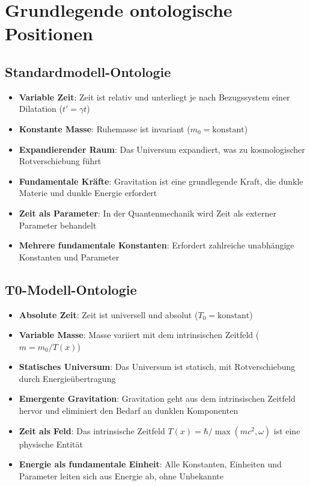 \documentclass[12pt,a4paper]{article}
\newcommand{\Tfield}{T(x)}
\newcommand{\Tzero}{T_0}
\begin{document}
	\section{Grundlegende ontologische Positionen}
	
	\subsection{Standardmodell-Ontologie}
	\begin{itemize}
		\item \textbf{Variable Zeit}: Zeit ist relativ und unterliegt je nach Bezugssystem einer Dilatation (\( t' = \gamma t \))
		\item \textbf{Konstante Masse}: Ruhemasse ist invariant (\( m_0 = \text{konstant} \))
		\item \textbf{Expandierender Raum}: Das Universum expandiert, was zu kosmologischer Rotverschiebung führt
		\item \textbf{Fundamentale Kräfte}: Gravitation ist eine grundlegende Kraft, die dunkle Materie und dunkle Energie erfordert
		\item \textbf{Zeit als Parameter}: In der Quantenmechanik wird Zeit als externer Parameter behandelt
		\item \textbf{Mehrere fundamentale Konstanten}: Erfordert zahlreiche unabhängige Konstanten und Parameter
	\end{itemize}
	
	\subsection{T0-Modell-Ontologie}
	\begin{itemize}
		\item \textbf{Absolute Zeit}: Zeit ist universell und absolut (\( \Tzero = \text{konstant} \))
		\item \textbf{Variable Masse}: Masse variiert mit dem intrinsischen Zeitfeld (\( m = m_0 / \Tfield \))
		\item \textbf{Statisches Universum}: Das Universum ist statisch, mit Rotverschiebung durch Energieübertragung
		\item \textbf{Emergente Gravitation}: Gravitation geht aus dem intrinsischen Zeitfeld hervor und eliminiert den Bedarf an dunklen Komponenten
		\item \textbf{Zeit als Feld}: Das intrinsische Zeitfeld \( \Tfield = \hbar / \max(mc^2, \omega) \) ist eine physische Entität
		\item \textbf{Energie als fundamentale Einheit}: Alle Konstanten, Einheiten und Parameter leiten sich aus Energie ab, ohne Unbekannte
	\end{itemize}
	
\end{document}
